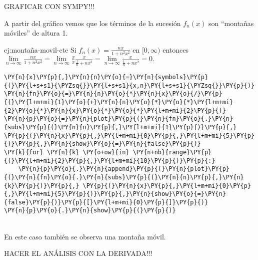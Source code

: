 GRAFICAR CON SYMPY!!!

A partir del gráfico vemos que los términos de la sucesión $f_n(x)$ son ``montañas móviles'' de altura 1.


\begin{ejemplo}{ej:montaña-movil-cte}
Si  $f_n(x)=\frac{nx}{1+n^2x^2}$ en $[0,\infty)$
entonces 
$\lim\limits_{n \to \infty} \frac{nx}{1+n^2x^2}=
\lim\limits_{n\to \infty} \frac{x}{x}\frac{x}{\frac{1}{n}+nx^2}=
\lim\limits_{n \to \infty}\frac{x}{\frac{1}{n}+nx^2}=0.$ 
\end{ejemplo}


    \begin{tcolorbox}[breakable, size=fbox, boxrule=1pt, pad at break*=1mm,colback=cellbackground, colframe=cellborder]
\begin{Verbatim}[commandchars=\\\{\}]
\PY{n}{x}\PY{p}{,}\PY{n}{n}\PY{o}{=}\PY{n}{symbols}\PY{p}{(}\PY{l+s+s1}{\PYZsq{}}\PY{l+s+s1}{x,n}\PY{l+s+s1}{\PYZsq{}}\PY{p}{)}
\PY{n}{fn}\PY{o}{=}\PY{n}{n}\PY{o}{*}\PY{n}{x}\PY{o}{/}\PY{p}{(}\PY{l+m+mi}{1}\PY{o}{+}\PY{n}{n}\PY{o}{*}\PY{o}{*}\PY{l+m+mi}{2}\PY{o}{*}\PY{n}{x}\PY{o}{*}\PY{o}{*}\PY{l+m+mi}{2}\PY{p}{)}
\PY{n}{p}\PY{o}{=}\PY{n}{plot}\PY{p}{(}\PY{n}{fn}\PY{o}{.}\PY{n}{subs}\PY{p}{(}\PY{n}{n}\PY{p}{,}\PY{l+m+mi}{1}\PY{p}{)}\PY{p}{,} \PY{p}{(}\PY{n}{x}\PY{p}{,}\PY{l+m+mi}{0}\PY{p}{,}\PY{l+m+mi}{5}\PY{p}{)}\PY{p}{,}\PY{n}{show}\PY{o}{=}\PY{n}{false}\PY{p}{)}
\PY{k}{for} \PY{n}{k} \PY{o+ow}{in} \PY{n+nb}{range}\PY{p}{(}\PY{l+m+mi}{2}\PY{p}{,}\PY{l+m+mi}{10}\PY{p}{)}\PY{p}{:}
    \PY{n}{p}\PY{o}{.}\PY{n}{append}\PY{p}{(}\PY{n}{plot}\PY{p}{(}\PY{n}{fn}\PY{o}{.}\PY{n}{subs}\PY{p}{(}\PY{n}{n}\PY{p}{,}\PY{n}{k}\PY{p}{)}\PY{p}{,} \PY{p}{(}\PY{n}{x}\PY{p}{,}\PY{l+m+mi}{0}\PY{p}{,}\PY{l+m+mi}{5}\PY{p}{)}\PY{p}{,}\PY{n}{show}\PY{o}{=}\PY{n}{false}\PY{p}{)}\PY{p}{[}\PY{l+m+mi}{0}\PY{p}{]}\PY{p}{)}
\PY{n}{p}\PY{o}{.}\PY{n}{show}\PY{p}{(}\PY{p}{)}
\end{Verbatim}
\end{tcolorbox}

    \begin{center}
    \end{center}
    { \hspace*{\fill} \\}
En este caso también se observa una montaña móvil. 

HACER EL ANÁLISIS CON LA DERIVADA!!!

